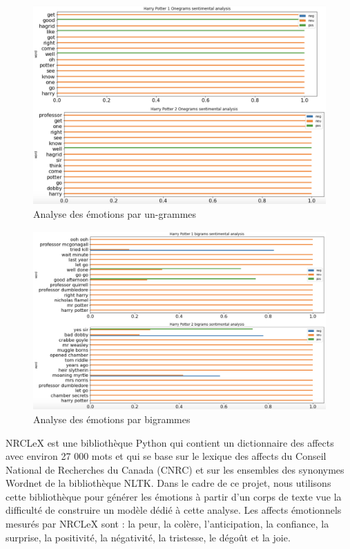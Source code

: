 \documentclass[11pt]{article}
\begin{document}
\begin{figure}[hbt!]
    \centering
    \includegraphics[width= 17 cm]{./figures/emotions_onegrams.png}
    \caption{Analyse des émotions par un-grammes}
\end{figure}
\FloatBarrier
\begin{figure}[hbt!]
    \centering
    \includegraphics[width= 17 cm]{./figures/emotions_bigrams.png}
    \caption{Analyse des émotions par bigrammes}
\end{figure}
\FloatBarrier

NRCLeX est une bibliothèque Python qui contient un dictionnaire des affects avec environ 27 000 mots et qui se base sur le lexique des affects du Conseil National de Recherches du Canada (CNRC) et sur les ensembles des synonymes Wordnet de la bibliothèque NLTK. Dans le cadre de ce projet, nous utilisons cette bibliothèque pour générer les émotions à partir d'un corps de texte vue la difficulté de construire un modèle dédié à cette analyse. Les affects émotionnels mesurés par NRCLeX sont : la peur, la colère, l'anticipation, la confiance, la surprise, la positivité, la négativité, la tristesse, le dégoût et la joie.\par
\end{document}
